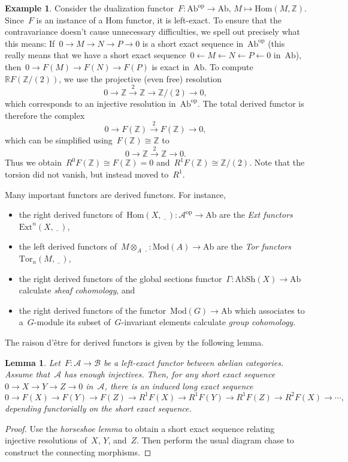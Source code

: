 \documentclass{amsart}
\theoremstyle{definition}
\newtheorem{ex}[defn]{Example}
\theoremstyle{plain}
\newtheorem{lemma}[defn]{Lemma}
\theoremstyle{remark}
\newcommand{\ZZ}{\mathbb{Z}}
\newcommand{\A}{\mathcal{A}}
\newcommand{\B}{\mathcal{B}}
\newcommand{\RR}{\mathbb{R}}
\newcommand{\Ext}{\mathrm{Ext}}
\newcommand{\Tor}{\mathrm{Tor}}
\newcommand{\Hom}{\mathrm{Hom}}
\newcommand{\placeholder}{\underline{\ \ \ }}
\newcommand{\Ab}{\mathrm{Ab}}
\newcommand{\AbSh}{\mathrm{AbSh}}
\newcommand{\Mod}{\mathrm{Mod}}
\newcommand{\op}{\mathrm{op}}
\newcommand{\?}{\,{:}\,}
\renewcommand{\_}{\mathpunct{.}\,}
\newcommand{\lra}{\longrightarrow}
\begin{document}
\begin{ex}Consider the dualization functor~$F : \Ab^\op \to \Ab,\,M \mapsto
\Hom(M,\ZZ)$. Since~$F$ is an instance of a Hom functor, it is left-exact. To
ensure that the contravariance doesn't cause unnecessary difficulties, we spell
out precisely what this means: If~$0 \to M \to N \to P \to 0$ is a short exact
sequence in~$\Ab^\op$ (this really means that we have a short exact sequence~$0
\leftarrow M \leftarrow N \leftarrow P \leftarrow 0$ in~$\Ab$), then~$0 \to F(M) \to F(N) \to
F(P)$ is exact in~$\Ab$. To compute~$\RR F(\ZZ/(2))$, we use the projective
(even free) resolution
\[ 0 \lra \ZZ \stackrel{2}{\longrightarrow} \ZZ \lra \ZZ/(2) \lra 0, \]
which corresponds to an injective resolution in~$\Ab^\op$. The total derived
functor is therefore the complex
\[ 0 \lra F(\ZZ) \stackrel{2}{\longrightarrow} F(\ZZ) \lra 0, \]
which can be simplified using~$F(\ZZ) \cong \ZZ$ to
\[ 0 \lra \ZZ \stackrel{2}{\longrightarrow} \ZZ \lra 0. \]
Thus we obtain~$R^0 F(\ZZ) \cong F(\ZZ) = 0$ and~$R^1 F(\ZZ) \cong \ZZ/(2)$.
Note that the torsion did not vanish, but instead moved to~$R^1$.
\end{ex}

Many important functors are derived functors. For instance,
\begin{itemize}
\item the right derived functors of~$\Hom(X, \placeholder) : \A^\op \to
\Ab$ are the \emph{Ext functors} $\Ext^n(X, \placeholder)$,
\item the left derived functors of~$M \otimes_A \placeholder : \Mod(A) \to \Ab$
are the \emph{Tor functors} $\Tor_n(M, \placeholder)$,
\item the right derived functors of the global sections functor~$\Gamma :
\AbSh(X) \to \Ab$ calculate \emph{sheaf cohomology}, and
\item the right derived functors of the functor~$\Mod(G) \to \Ab$ which associates to
a~$G$-module its subset of~$G$-invariant elements calculate \emph{group
cohomology}.
\end{itemize}

The raison d'être for derived functors is given by the following lemma.

\begin{lemma}Let~$F : \A \to \B$ be a left-exact functor between abelian
categories. Assume that~$\A$ has enough injectives. Then, for any short exact
sequence~$0 \to X \to Y \to Z \to 0$ in~$\A$, there is an induced long exact
sequence
\[ 0 \to F(X) \to F(Y) \to F(Z) \to R^1 F(X) \to R^1 F(Y) \to R^1 F(Z) \to R^2
F(X) \to \cdots, \]
depending functorially on the short exact sequence.\end{lemma}
\begin{proof}Use the \emph{horseshoe lemma} to obtain a short exact sequence
relating injective resolutions of~$X$, $Y$, and~$Z$. Then perform the usual
diagram chase to construct the connecting morphisms.\end{proof}
\end{document}
